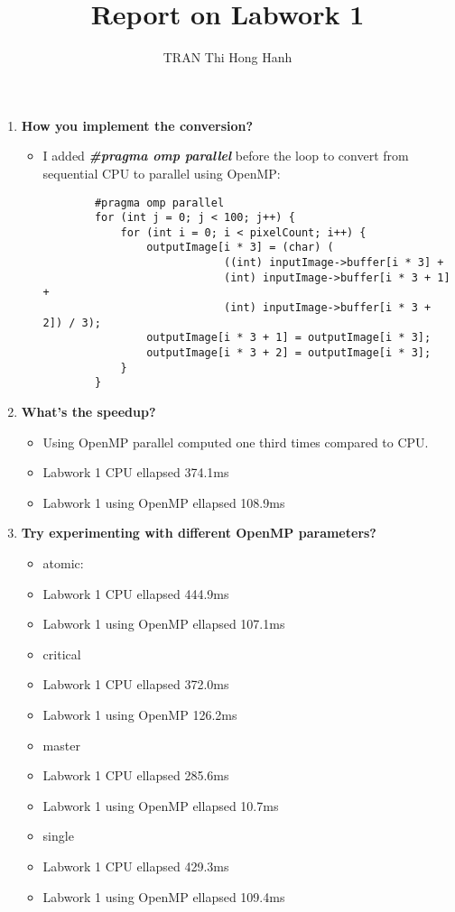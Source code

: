 \documentclass{article}
\title{Report on Labwork 1}
\author{TRAN Thi Hong Hanh}
\begin{document}
\maketitle
\begin{enumerate}
    \item \textbf{How you implement the conversion?}
    \begin{itemize}
        \item I added \textbf{\textit{\#pragma omp parallel}} before the loop to convert from sequential CPU to parallel using OpenMP:
    \begin{verbatim}
        #pragma omp parallel 
        for (int j = 0; j < 100; j++) {     
            for (int i = 0; i < pixelCount; i++) {
                outputImage[i * 3] = (char) (
                            ((int) inputImage->buffer[i * 3] +
                            (int) inputImage->buffer[i * 3 + 1] +
                            (int) inputImage->buffer[i * 3 + 2]) / 3);
                outputImage[i * 3 + 1] = outputImage[i * 3];
                outputImage[i * 3 + 2] = outputImage[i * 3];
            }
        }
    \end{verbatim}
    \end{itemize}
    \item \textbf{What’s the speedup?}
    \begin{itemize}
        \item Using OpenMP parallel computed one third times compared to CPU.
        \item [] Labwork 1 CPU ellapsed 374.1ms
        \item [] Labwork 1 using OpenMP ellapsed 108.9ms
    \end{itemize}
    \item \textbf{Try experimenting with different OpenMP parameters?}
    \begin{itemize}
        \item atomic:
        \item [] Labwork 1 CPU ellapsed 444.9ms
        \item [] Labwork 1 using OpenMP  ellapsed 107.1ms
        \item critical
        \item [] Labwork 1 CPU ellapsed 372.0ms
        \item [] Labwork 1 using OpenMP 126.2ms
        \item master
        \item [] Labwork 1 CPU ellapsed 285.6ms
        \item [] Labwork 1 using OpenMP ellapsed 10.7ms
        \item single
        \item []  Labwork 1 CPU ellapsed 429.3ms
        \item [] Labwork 1 using OpenMP ellapsed 109.4ms



    \end{itemize}
\end{enumerate}
\end{document}
